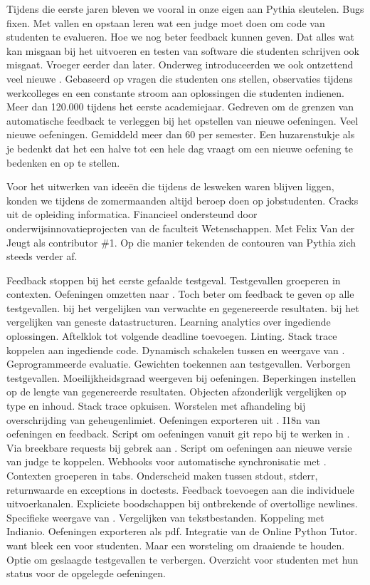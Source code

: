 Tijdens die eerste jaren bleven we vooral in onze eigen  aan Pythia sleutelen.
Bugs fixen.
Met vallen en opstaan leren wat een judge moet doen om code van studenten te evalueren.
Hoe we nog beter feedback kunnen geven.
Dat alles wat kan misgaan bij het uitvoeren en testen van software die studenten schrijven ook misgaat.
Vroeger eerder dan later.
Onderweg introduceerden we ook ontzettend veel nieuwe .
Gebaseerd op vragen die studenten ons stellen, observaties tijdens werkcolleges en een constante stroom aan oplossingen die studenten indienen.
Meer dan 120.000 tijdens het eerste academiejaar.
Gedreven om de grenzen van automatische feedback te verleggen bij het opstellen van nieuwe oefeningen.
Veel nieuwe oefeningen.
Gemiddeld meer dan 60 per semester.
Een huzarenstukje als je bedenkt dat het een halve tot een hele dag vraagt om een nieuwe oefening
te bedenken en op te stellen.

Voor het uitwerken van ideeën die tijdens de lesweken waren blijven liggen, konden we tijdens de zomermaanden altijd beroep doen op jobstudenten.
Cracks uit de opleiding informatica.
Financieel ondersteund door onderwijsinnovatieprojecten van de faculteit Wetenschappen.
Met Felix Van der Jeugt als contributor \#1.
Op die manier tekenden de contouren van Pythia zich steeds verder af.

Feedback stoppen bij het eerste gefaalde testgeval.
Testgevallen groeperen in contexten.
Oefeningen omzetten naar .
Toch beter om feedback te geven op alle testgevallen.
 bij het vergelijken van verwachte en gegenereerde resultaten.
 bij het vergelijken van geneste datastructuren.
Learning analytics over ingediende oplossingen.
Aftelklok tot volgende deadline toevoegen.
Linting.
Stack trace koppelen aan ingediende code.
Dynamisch schakelen tussen  en  weergave van .
Geprogrammeerde evaluatie.
Gewichten toekennen aan testgevallen.
Verborgen testgevallen.
Moeilijkheidsgraad weergeven bij oefeningen.
Beperkingen instellen op de lengte van gegenereerde resultaten.
Objecten afzonderlijk vergelijken op type en inhoud.
Stack trace opkuisen.
Worstelen met afhandeling bij overschrijding van geheugenlimiet.
Oefeningen exporteren uit \@.
I18n van oefeningen en feedback.
Script om oefeningen vanuit git repo bij te werken in \@.
Via breekbare  requests bij gebrek aan \@.
Script om oefeningen aan nieuwe versie van judge te koppelen.
Webhooks voor automatische synchronisatie met \@.
Contexten groeperen in tabs.
Onderscheid maken tussen stdout, stderr, returnwaarde en exceptions in doctests.
Feedback toevoegen aan die individuele uitvoerkanalen.
Expliciete boodschappen bij ontbrekende of overtollige newlines.
Specifieke weergave van .
Vergelijken van tekstbestanden.
Koppeling met Indianio.
Oefeningen exporteren als pdf.
Integratie van de Online Python Tutor.
 want bleek een  voor studenten.
Maar een worsteling om draaiende te houden.
Optie om geslaagde testgevallen te verbergen.
Overzicht voor studenten met hun status voor de opgelegde oefeningen.


